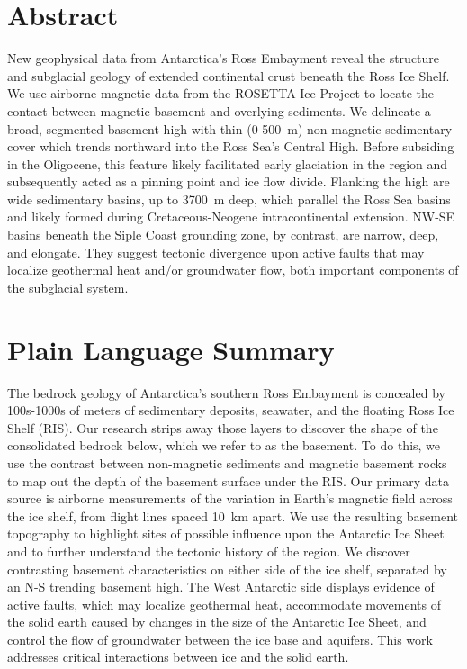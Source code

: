 
\section*{Abstract}

New geophysical data from Antarctica's Ross Embayment reveal the structure and subglacial geology of extended continental crust beneath the Ross Ice Shelf. We use airborne magnetic data from the ROSETTA-Ice Project to locate the contact between magnetic basement and overlying sediments. We delineate a broad, segmented basement high with thin (0-500~m) non-magnetic sedimentary cover which trends northward into the Ross Sea's Central High. Before subsiding in the Oligocene, this feature likely facilitated early glaciation in the region and subsequently acted as a pinning point and ice flow divide. Flanking the high are wide sedimentary basins, up to 3700~m deep, which parallel the Ross Sea basins and likely formed during Cretaceous-Neogene intracontinental extension. NW-SE basins beneath the Siple Coast grounding zone, by contrast, are narrow, deep, and elongate. They suggest tectonic divergence upon active faults that may localize geothermal heat and/or groundwater flow, both important components of the subglacial system.

\section*{Plain Language Summary}

The bedrock geology of Antarctica’s southern Ross Embayment is concealed by 100s-1000s of meters of sedimentary deposits, seawater, and the floating Ross Ice Shelf (RIS). Our research strips away those layers to discover the shape of the consolidated bedrock below, which we refer to as the basement. To do this, we use the contrast between non-magnetic sediments and magnetic basement rocks to map out the depth of the basement surface under the RIS. Our primary data source is airborne measurements of the variation in Earth’s magnetic field across the ice shelf, from flight lines spaced 10~km apart. We use the resulting basement topography to highlight sites of possible influence upon the Antarctic Ice Sheet and to further understand the tectonic history of the region. We discover contrasting basement characteristics on either side of the ice shelf, separated by an N-S trending basement high. The West Antarctic side displays evidence of active faults, which may localize geothermal heat, accommodate movements of the solid earth caused by changes in the size of the Antarctic Ice Sheet, and control the flow of groundwater between the ice base and aquifers. This work addresses critical interactions between ice and the solid earth.

